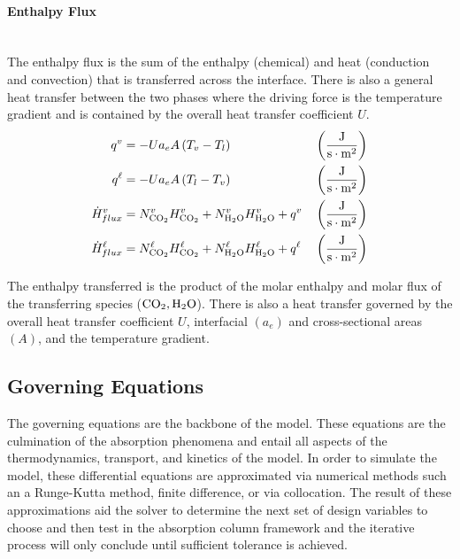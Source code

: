 \documentclass[a4paper,fleqn]{cas-sc}
\newcommand{\COtwo}{{\ce{CO2}}}
\newcommand{\HtwoO}{{\ce{H2O}}}
\newcommand{\liq}{\ell}
\newcommand{\vap}{v}
\begin{document}
    \paragraph{Enthalpy Flux}\mbox{}\\[0.5em]
    The enthalpy flux is the sum of the enthalpy (chemical) and heat (conduction and convection) that is transferred across the interface. There is also a general heat transfer between the two phases where the driving force is the temperature gradient and is contained by the overall heat transfer coefficient $U$.
    \begin{align}
        q^{\vap} &= -U a_e A \left(T_v-T_l\right) && \left(\frac{\unit{J}}                    {\unit{s\cdot m^2}} \right) \\
        q^{\liq} &= -U a_e A \left(T_l-T_v\right) && \left(\frac{\unit{J}}                    {\unit{s\cdot m^2}} \right) \\
        \dot{H}^{\vap}_{flux} &=   N^{\vap}_{ \COtwo}H^{\vap}_{ \COtwo} + N^{\vap}_{ \HtwoO}H^{\vap}_{ \HtwoO} +  q^{\vap} && \left(\frac{\unit{J}}{\unit{s\cdot m^2}} \right) \\
        \dot{H}^{\liq}_{flux} &= N^{\liq}_{ \COtwo}H^{\liq}_{ \COtwo} + N^{\liq}_{ \HtwoO}H^{\liq}_{ \HtwoO} +  q^{\liq} && \left(\frac{\unit{J}}{\unit{s\cdot m^2}} \right)
    \end{align}

    The enthalpy transferred is the product of the molar enthalpy and molar flux of the transferring species ($\COtwo, \HtwoO$). There is also a heat transfer governed by the overall heat transfer coefficient $U$, interfacial $\left(a_e\right)$ and cross-sectional areas $\left(A\right)$, and the temperature gradient.

    \subsection{Governing Equations}\label{subsec:governing-equations}
    The governing equations are the backbone of the model. These equations are the culmination of the absorption phenomena and entail all aspects of the thermodynamics, transport, and kinetics of the model. In order to simulate the model, these differential equations are approximated via numerical methods such an a Runge-Kutta method, finite difference, or via collocation. The result of these approximations aid the solver to determine the next set of design variables to choose and then test in the absorption column framework and the iterative process will only conclude until sufficient tolerance is achieved.
\end{document}
